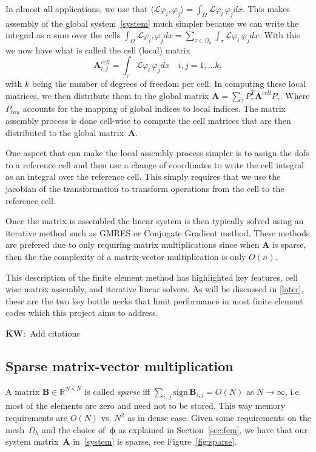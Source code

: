 \documentclass[12pt]{article}
\newcommand{\vect}[1]{\boldsymbol{\mathbf{#1}}}
\newcommand{\KW}[1]{{\color{blue}\textbf{KW}:~#1}}
\newcommand{\dimSize}{N}
\begin{document}
In almost all applications, we use that 
$\langle \mathcal{L}\varphi_{i}, \varphi_{j}\rangle = \int_{\Omega}\mathcal{L}\varphi_{i}\, \varphi_{j}dx $. This makes assembly of the global system~\eqref{system} much simpler because we can write the integral as a sum over the cells $ \int_{\Omega}\mathcal{L}\varphi_{i}, \varphi_{j}dx = \sum_{\tau\in\Omega_h} \int_{\tau}\mathcal{L}\varphi_{i}\, \varphi_{j}dx $. With this we now have what is called the cell (local) matrix 
$$ 
	\mathbf{A}^{cell}_{i,j} = \int_{\tau}\mathcal{L}\varphi_{i}\, \varphi_{j}dx\quad i, j = 1, \ldots k,
$$ 
with $k$ being the number of degrees of freedom per cell. In computing these local matrices, we then distribute them to the global matrix $ \mathbf{A} = \sum_{\tau}P^{T}_{\tau}\mathbf{A}^{cell}P_{\tau} $. Where $P_{tau}$ accounts for the mapping of global indices to local indices. The matrix assembly process is done cell-wise to compute the cell matrices that are then distributed to the global matrix~$\vect A$. 

One aspect that can make the local assembly process simpler is to assign the dofs to a reference cell and then use a change of coordinates to write the cell integral as an integral over the reference cell. This simply requires that we use the jacobian of the transformation to transform operations from the cell to the reference cell.

Once the matrix is assembled the linear system is then typically solved using an iterative method such as GMRES or Conjugate Gradient method. These methods are prefered due to only requiring matrix multiplications since when $\mathbf{A}$ is sparse, then the the complexity of a matrix-vector multiplication is only $O(n)$. 

This description of the finite element method has highlighted key features, cell wise matrix assembly, and iterative linear solvers. As will be discussed in \ref{later}, these are the two key bottle necks that limit performance in most finite element codes which this project aims to address. 

\KW{Add citations}

\subsection{Sparse matrix-vector multiplication}

A matrix $\vect B \in \mathbb R^{\dimSize\times\dimSize}$ is called \textit{sparse} iff $\sum_{i,\,j} \mbox{sign}\,\vect B_{i,j} = O(\dimSize)$ as $\dimSize \rightarrow \infty$, i.e. most of the elements are zero and need not to be stored. This way memory requirements are $O(\dimSize)$ vs. $\dimSize^2$ as in dense case. Given some requirements on the mesh~$\Omega_h$ and the choice of~$\vect\phi$ as explained in Section~\ref{sec:fem}, we have that our system matrix~$\vect A$ in~\eqref{system} is sparse, see Figure~\ref{fig:sparse}.
\end{document}
